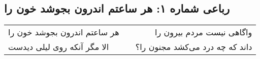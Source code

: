 \begin{center}
\section*{رباعی شماره ۱: هر ساعتم اندرون بجوشد خون را}
\label{sec:001}
\begin{longtable}{l p{0.5cm} r}
هر ساعتم اندرون بجوشد خون را
&&
واگاهی نیست مردم بیرون را
\\
الا مگر آنکه روی لیلی دیدست
&&
داند که چه درد می‌کشد مجنون را؟
\\
\end{longtable}
\end{center}

